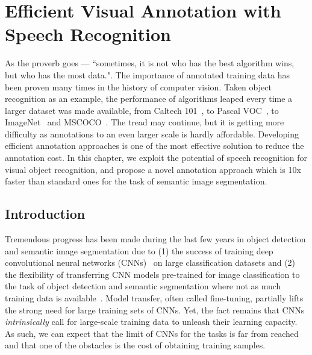 \chapter{Efficient Visual Annotation with Speech Recognition}
\label{ch:draw-and-tell}

As the proverb goes --- ``sometimes, it is not who has the best algorithm wins, but who has the most data.". The importance of annotated training data has been proven many times in the history of computer vision. Taken object recognition as an example, the performance of algorithms leaped every time a larger dataset was made available, from Caltech 101~\citep{FeiFei2004}, to Pascal VOC~\citep{pascal:2011}, to ImageNet~\citep{imagenet} and MSCOCO~\citep{coco:eccv}.  The tread may continue, but it is getting more difficulty as  annotations to an even larger scale is hardly affordable.  Developing efficient annotation approaches is one of the most effective solution to reduce the annotation cost.   In this chapter, we exploit the potential of speech recognition for visual object recognition, and propose a novel annotation approach which is 10x faster than standard ones for the task of semantic image segmentation. 

\section{Introduction}
Tremendous progress has been made during the last few years in 
object detection and semantic image segmentation due to (1) the success of
training deep convolutional neural networks (CNNs)~\citep{deepnet:nips12, Decaf:icml2014, vgg16} on large classification datasets and (2) the
flexibility of transferring CNN models pre-trained for image classification to the
task of object detection and semantic segmentation where not as much training data is
available~\citep{rcnn, Long_2015_CVPR, rcnn_crf}. Model transfer,
often called fine-tuning, partially lifts the strong need for large
training sets of CNNs. Yet, the fact remains that CNNs \emph{intrinsically} 
call for large-scale training data to unleash their learning capacity. 
As such, we can expect that the limit of CNNs for the tasks
is far from reached and that one of the obstacles 
is the cost of obtaining training samples.  

